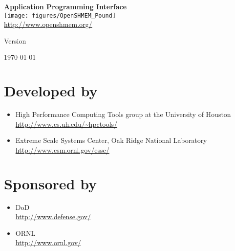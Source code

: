\thispagestyle{empty}
\begin{center}
\textbf{\Huge \openshmem}
\par
\end{center}

\begin{center}
\textbf{\LARGE Application Programming Interface}\\
\texttt{[image: figures/OpenSHMEM\_Pound]}\\
\url{http://www.openshmem.org/}
\par
\end{center}

\begin{center}
Version \insertDocVersion
\par
\end{center}

\vspace{0.5in}
\begin{center}
\today
\end{center}

\vspace{0.5in}

\vfill{}

\section*{Developed by}
\begin{itemize}
\item High Performance Computing Tools group at the University of Houston\\
  \url{http://www.cs.uh.edu/~hpctools/} 
\item Extreme Scale Systems Center, Oak Ridge National Laboratory\\
  \url{http://www.csm.ornl.gov/essc/} 
\end{itemize}
\pagebreak{}

\section*{Sponsored by}
\begin{itemize}
\item \ac{DoD}\\
  \url{http://www.defense.gov/ }
\item \ac{ORNL}\\
  \url{http://www.ornl.gov/} 
\end{itemize}

